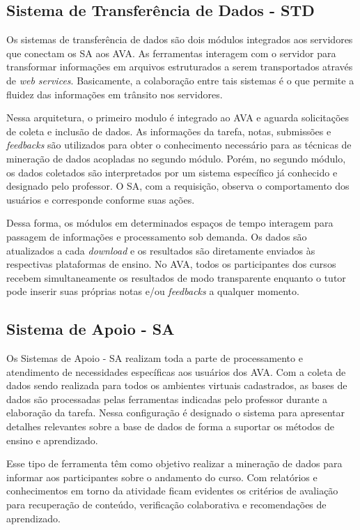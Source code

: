 \subsection{Sistema de Transferência de Dados - STD}
Os sistemas de transferência de dados são dois módulos integrados aos servidores que conectam os SA aos AVA. As ferramentas interagem com o servidor para transformar informações em arquivos estruturados a serem transportados através de \textit{web services}. Basicamente, a colaboração entre tais sistemas é o que permite a fluidez das informações em trânsito nos servidores.

Nessa arquitetura, o primeiro modulo é integrado ao AVA e aguarda solicitações de coleta e inclusão de dados. As informações da tarefa, notas, submissões e \textit{feedbacks} são utilizados para obter o conhecimento necessário para as técnicas de mineração de dados acopladas no segundo módulo. Porém, no segundo módulo, os dados coletados são interpretados por um sistema específico já conhecido e designado pelo professor. O SA, com a requisição, observa o comportamento dos usuários e corresponde conforme suas ações.

Dessa forma, os módulos em determinados espaços de tempo interagem para passagem de informações e processamento sob demanda. Os dados são atualizados a cada \textit{download} e os resultados são diretamente enviados às respectivas plataformas de ensino. No AVA, todos os participantes dos cursos recebem simultaneamente os resultados de modo transparente enquanto o tutor pode inserir suas próprias notas e/ou \textit{feedbacks} a qualquer momento.

\subsection{Sistema de Apoio - SA}
Os Sistemas de Apoio - SA realizam toda a parte de processamento e atendimento de necessidades específicas aos usuários dos AVA. Com a coleta de dados sendo realizada para todos os ambientes virtuais cadastrados, as bases de dados são processadas pelas ferramentas indicadas pelo professor durante a elaboração da tarefa. Nessa configuração é designado o sistema para apresentar detalhes relevantes sobre a base de dados de forma a suportar os métodos de ensino e aprendizado.

Esse tipo de ferramenta têm como objetivo realizar a mineração de dados para informar aos participantes sobre o andamento do curso. Com relatórios e conhecimentos em torno da atividade ficam evidentes os critérios de avaliação para recuperação de conteúdo, verificação colaborativa e recomendações de aprendizado.

